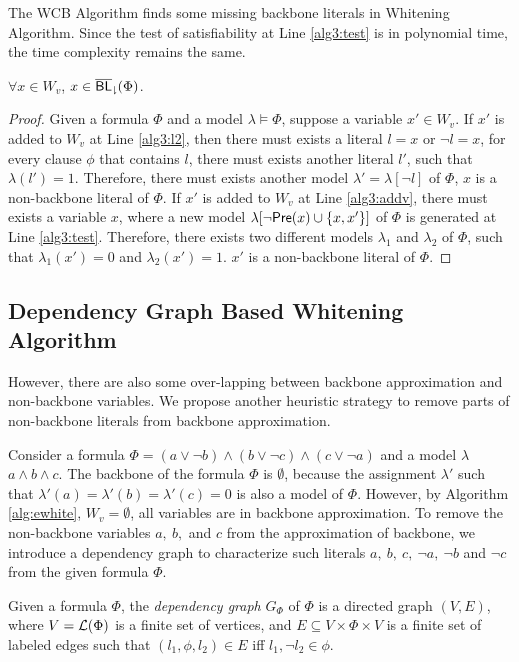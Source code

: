 The WCB Algorithm finds some missing backbone literals in Whitening Algorithm. Since the test of satisfiability at Line \ref{alg3:test} is in polynomial time, the time complexity remains the same.

\begin{theorem}
$\forall x\in W_v$, $x\in{\sf \overline{BL}_\downharpoonright}(\Phi)$.
\end{theorem}

\begin{proof}
Given a formula $\Phi$ and a model $\lambda\models\Phi$, suppose a variable $x'\in W_v$. If $x'$ is added to $W_v$ at Line \ref{alg3:l2}, then there must exists a literal $l=x$ or $\neg l=x$, for every clause $\phi$ that contains $l$, there must exists another literal $l'$, such that $\lambda(l')=1$. Therefore, there must exists another model $\lambda'=\lambda[\neg l]$ of $\Phi$, $x$ is a non-backbone literal of $\Phi$.
If $x'$ is added to $W_v$ at Line \ref{alg3:addv}, there must exists a variable $x$, where a new model $\lambda[\neg \textsf{Pre}(x)\cup \{x,x'\}]$ of $\Phi$ is generated at Line \ref{alg3:test}. Therefore, there exists two different models $\lambda_1$ and $\lambda_2$ of $\Phi$, such that $\lambda_1(x')=0$ and $\lambda_2(x')=1$. $x'$ is a non-backbone literal of $\Phi$.
\end{proof}
\medskip


\iffalse
\subsection{Dependency Graph Based Whitening Algorithm}

However, there are also some over-lapping between backbone approximation and non-backbone variables. We propose another heuristic strategy to remove parts of non-backbone literals from backbone approximation.

Consider a formula $\Phi=(a\vee\neg b)\wedge(b\vee\neg c)\wedge(c\vee\neg a)$ and a model $\lambda$ $a\wedge b\wedge c$. The backbone of the formula $\Phi$ is $\emptyset$, because the assignment $\lambda'$ such that $\lambda'(a)=\lambda'(b)=\lambda'(c)=0$ is also a model of $\Phi$.
However, by Algorithm \ref{alg:ewhite}, $W_v=\emptyset$, all variables are in backbone approximation. To remove the non-backbone variables $a, \ b, $ and $c$ from the approximation of backbone, we introduce a dependency graph to characterize such literals $a, \ b, \ c, \ \neg a, \ \neg b$ and  $\neg c$ from  the given formula $\Phi$.

Given a formula $\Phi$, the \emph{dependency graph} $G_\Phi$ of $\Phi$ is a directed graph $(V,E)$, where
$V=\Lit(\Phi)$ is a finite set of vertices, and $E\subseteq V\times \Phi\times V$ is a finite set of labeled edges such that
$(l_1,\phi, l_2)\in E$ iff $l_1,\neg l_2\in \phi$.

